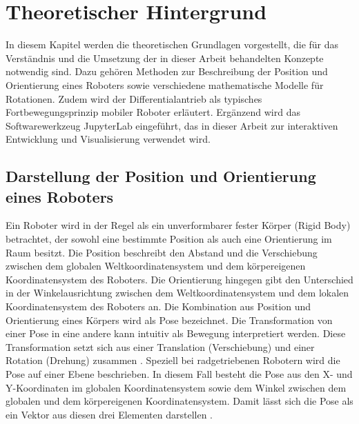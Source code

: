 \section{Theoretischer Hintergrund}
In diesem Kapitel werden die theoretischen Grundlagen vorgestellt, die für das Ver\-ständ\-nis und die Umsetzung der in dieser Arbeit behandelten Konzepte notwendig sind.
Dazu gehören Methoden zur Beschreibung der Position und Orientierung eines Roboters sowie verschiedene mathematische Modelle für Rotationen.
Zudem wird der Differentialantrieb als typisches Fortbewegungsprinzip mobiler Roboter erläutert. Ergänzend wird das Softwarewerkzeug JupyterLab eingeführt,
das in dieser Arbeit zur interaktiven Entwicklung und Visualisierung verwendet wird.

\subsection{Darstellung der Position und Orientierung eines Roboters}
Ein Roboter wird in der Regel als ein unverformbarer fester Körper (Rigid Body) betrachtet, der sowohl eine bestimmte Position als auch eine Orientierung im Raum besitzt.
Die Position beschreibt den Abstand und die Verschiebung zwischen dem globalen Weltkoordinatensystem und dem körpereigenen Koordinatensystem des Roboters.
Die Orientierung hingegen gibt den Unterschied in der Winkelausrichtung zwischen dem Weltkoordinatensystem und dem lokalen Koordinatensystem des Roboters an.
Die Kombination aus Position und Orientierung eines Körpers wird als Pose bezeichnet. Die Transformation von einer Pose in eine andere kann intuitiv als Bewegung interpretiert werden.
Diese Transformation setzt sich aus einer Translation (Verschiebung) und einer Rotation (Drehung) zusammen .
Speziell bei radgetriebenen Robotern wird die Pose auf einer Ebene beschrieben.
In diesem Fall besteht die Pose aus den X- und Y-Koordinaten im globalen Koordinatensystem sowie dem Winkel zwischen dem globalen und dem körpereigenen Koordinatensystem.
Damit lässt sich die Pose als ein Vektor aus diesen drei Elementen darstellen .


